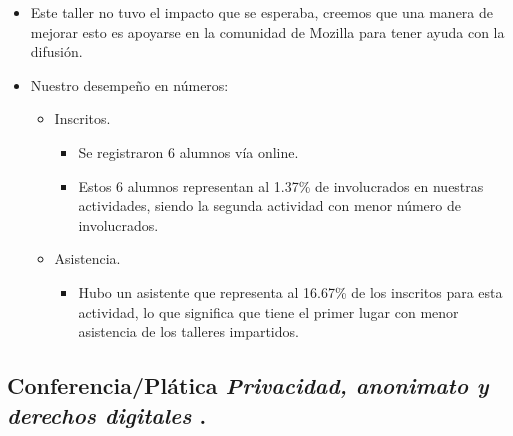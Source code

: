 \documentclass[a4paper,11pt]{article}                 %
\begin{document}
   
    \begin{itemize}
    \item Este taller no tuvo el impacto que se esperaba, creemos que una manera de mejorar esto es apoyarse en la comunidad de Mozilla para tener ayuda con la difusión.
    
    \item Nuestro desempeño en números:
    
    \begin{itemize}
 
    
    \item Inscritos.
    \begin{itemize}
      \item Se registraron 6 alumnos vía online.
      \item Estos 6 alumnos representan al 1.37\% de involucrados en nuestras actividades, siendo la segunda actividad con menor número de involucrados. 
    \end{itemize}
    
    \item Asistencia.
    \begin{itemize}
      \item Hubo un asistente que representa al 16.67\% de los inscritos para esta actividad, lo que significa que tiene el primer lugar con menor asistencia de los talleres impartidos. 
    \end{itemize}
    \end{itemize} 
    
  \end{itemize}  
  
  \subsection{Conferencia/Plática \textit{Privacidad, anonimato y derechos digitales }.}     
  
\end{document}

